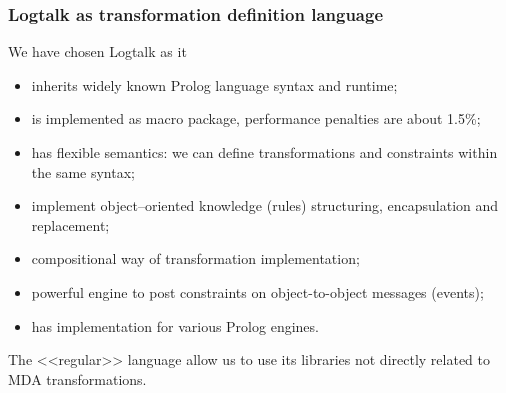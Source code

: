 \documentclass[10pt]{beamer}
\begin{document}


\begin{frame}
  \frametitle{Logtalk as transformation definition language}
  We have chosen Logtalk as it
  \begin{itemize}
  \item inherits widely known Prolog language syntax and runtime;
  \item is implemented as macro package, performance penalties are about 1.5\%;
  \item has flexible semantics: we can define transformations and constraints within the same syntax;
  \item implement object--oriented knowledge (rules) structuring, encapsulation and replacement;
  \item compositional way of transformation implementation;
  \item powerful engine to post constraints on object-to-object messages (events);
  \item has implementation for various Prolog engines.
  \end{itemize}
  The <<regular>> language allow us to use its libraries not directly related to MDA transformations.
\end{frame}
\end{document}
